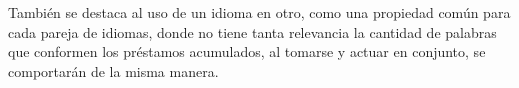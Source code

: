 También se destaca al uso de un idioma en otro, como una propiedad común para cada pareja de idiomas, donde no tiene tanta relevancia la cantidad de palabras que conformen los préstamos acumulados,   al tomarse y actuar  en conjunto,  se comportarán de la misma manera. 







